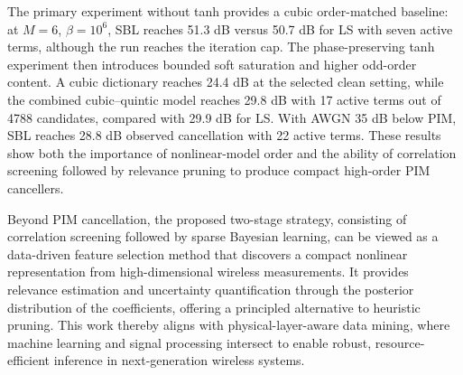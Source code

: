 \documentclass[conference]{IEEEtran}
\begin{document}
The primary experiment without tanh provides a cubic order-matched baseline: at $M=6$, $\beta=10^6$, SBL reaches 51.3 dB versus 50.7 dB for LS with seven active terms, although the run reaches the iteration cap. The phase-preserving tanh experiment then introduces bounded soft saturation and higher odd-order content. A cubic dictionary reaches 24.4 dB at the selected clean setting, while the combined cubic--quintic model reaches 29.8 dB with 17 active terms out of 4788 candidates, compared with 29.9 dB for LS. With AWGN 35 dB below PIM, SBL reaches 28.8 dB observed cancellation with 22 active terms. These results show both the importance of nonlinear-model order and the ability of correlation screening followed by relevance pruning to produce compact high-order PIM cancellers.

Beyond PIM cancellation, the proposed two-stage strategy, consisting of correlation screening followed by sparse Bayesian learning, can be viewed as a data-driven feature selection method that discovers a compact nonlinear representation from high-dimensional wireless measurements. It provides relevance estimation and uncertainty quantification through the posterior distribution of the coefficients, offering a principled alternative to heuristic pruning. This work thereby aligns with physical-layer-aware data mining, where machine learning and signal processing intersect to enable robust, resource-efficient inference in next-generation wireless systems.

\balance


\end{document}
